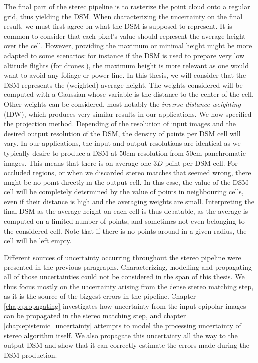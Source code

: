 The final part of the stereo pipeline is to rasterize the point cloud onto a regular grid, thus yielding the DSM. When characterizing the uncertainty on the final result, we must first agree on what the DSM is supposed to represent. It is common to consider that each pixel's value should represent the average height over the cell. However, providing the maximum or minimal height might be more adapted to some scenarios: for instance if the DSM is used to prepare very low altitude flights (for drones \etc), the maximum height is more relevant as one would want to avoid any foliage or power line. In this thesis, we will consider that the DSM represents the (weighted) average height. The weights considered will be computed with a Gaussian whose variable is the distance to the center of the cell. Other weights can be considered, most notably the \textit{inverse distance weighting} (IDW), which produces very similar results in our applications. We now specified the projection method. Depending of the resolution of input images and the desired output resolution of the DSM, the density of points per DSM cell will vary. In our applications, the input and output resolutions are identical as we typically desire to produce a DSM at $50$cm resolution from $50$cm panchromatic images. This means that there is on average one $3D$ point per DSM cell. For occluded regions, or when we discarded stereo matches that seemed wrong, there might be no point directly in the output cell. In this case, the value of the DSM cell will be completely determined by the value of points in neighbouring cells, even if their distance is high and the averaging weights are small. Interpreting the final DSM as the average height on each cell is thus debatable, as the average is computed on a limited number of points, and sometimes not even belonging to the considered cell.  Note that if there is no points around in a given radius, the cell will be left empty. 

Different sources of uncertainty occurring throughout the stereo pipeline were presented in the previous paragraphs. Characterizing, modelling and propagating all of those uncertainties could not be considered in the span of this thesis. We thus focus mostly on the uncertainty arising from the dense stereo matching step, as it is the source of the biggest errors in the pipeline. Chapter \ref{chap:propagating} investigates how uncertainty from the input epipolar images can be propagated in the stereo matching step, and chapter \ref{chap:epistemic_uncertainty} attempts to model the processing uncertainty of stereo algorithm itself. We also propagate this uncertainty all the way to the output DSM and show that it can correctly estimate the errors made during the DSM production. 

